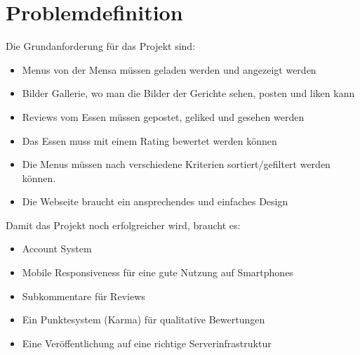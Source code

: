 \section{Problemdefinition}\label{sec:problemdefinition}

Die Grundanforderung für das Projekt sind:
\begin{itemize}
    \item Menus von der Mensa müssen geladen werden und angezeigt werden
    \item Bilder Gallerie, wo man die Bilder der Gerichte sehen, posten und liken kann
    \item Reviews vom Essen müssen gepostet, geliked und gesehen werden
    \item Das Essen muss mit einem Rating bewertet werden können
    \item Die Menus müssen nach verschiedene Kriterien sortiert/gefiltert werden können.
    \item Die Webseite braucht ein ansprechendes und einfaches Design
\end{itemize}

Damit das Projekt noch erfolgreicher wird, braucht es:
\begin{itemize}
    \item Account System
    \item Mobile Responsiveness für eine gute Nutzung auf Smartphones
    \item Subkommentare für Reviews
    \item Ein Punktesystem (Karma) für qualitative Bewertungen
    \item Eine Veröffentlichung auf eine richtige Serverinfrastruktur
\end{itemize}
